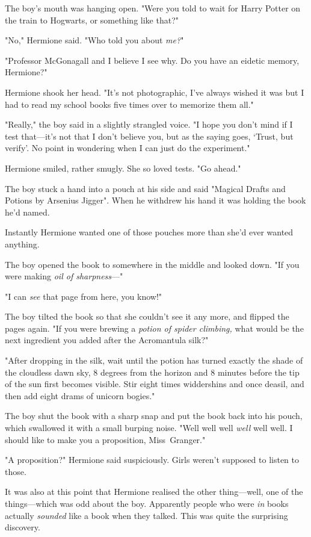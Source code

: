 The boy's mouth was hanging open. "Were you told to wait for Harry Potter on
the train to Hogwarts, or something like that?"

"No," Hermione said. "Who told you about \emph{me?}"

"Professor McGonagall and I believe I see why. Do you have an eidetic memory,
Hermione?"

Hermione shook her head. "It's not photographic, I've always wished it was but
I had to read my school books five times over to memorize them all."

"Really," the boy said in a slightly strangled voice. "I hope you don't mind if
I test that---it's not that I don't believe you, but as the saying goes,
`Trust, but verify'. No point in wondering when I can just do the experiment."

Hermione smiled, rather smugly. She so loved tests. "Go ahead."

The boy stuck a hand into a pouch at his side and said "Magical Drafts and
Potions by Arsenius Jigger". When he withdrew his hand it was holding the book
he'd named.

Instantly Hermione wanted one of those pouches more than she'd ever wanted
anything.

The boy opened the book to somewhere in the middle and looked down. "If you
were making \emph{oil of sharpness}---"

"I can \emph{see} that page from here, you know!"

The boy tilted the book so that she couldn't see it any more, and flipped the
pages again. "If you were brewing a \emph{potion of spider climbing,} what
would be the next ingredient you added after the Acromantula silk?"

"After dropping in the silk, wait until the potion has turned exactly the shade
of the cloudless dawn sky, 8 degrees from the horizon and 8 minutes before the
tip of the sun first becomes visible. Stir eight times widdershins and once
deasil, and then add eight drams of unicorn bogies."

The boy shut the book with a sharp snap and put the book back into his pouch,
which swallowed it with a small burping noise. "Well well well \emph{well} well
well. I should like to make you a proposition, Miss~Granger."

"A proposition?" Hermione said suspiciously. Girls weren't supposed to listen
to those.

It was also at this point that Hermione realised the other thing---well, one of
the things---which was odd about the boy. Apparently people who were \emph{in}
books actually \emph{sounded} like a book when they talked. This was quite the
surprising discovery.

